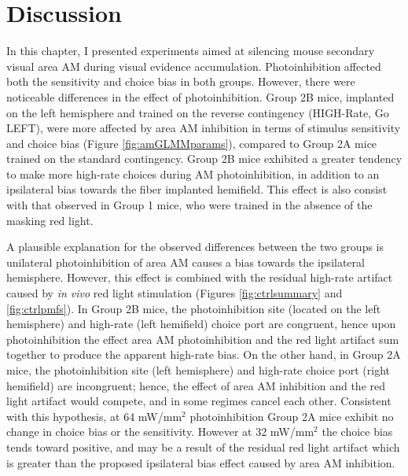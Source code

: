 \section{Discussion}
In this chapter, I presented experiments aimed at silencing mouse secondary visual area AM during visual evidence accumulation. Photoinhibition affected both the sensitivity and choice bias in both groups. However, there were noticeable differences in the effect of photoinhibition. Group 2B mice, implanted on the left hemisphere and trained on the reverse contingency (HIGH-Rate, Go LEFT), were more affected by area AM inhibition in terms of stimulus sensitivity and choice bias (Figure \ref{fig:amGLMMparams}), compared to Group 2A mice trained on the standard contingency. Group 2B mice exhibited a greater tendency to make more high-rate choices during AM photoinhibition, in addition to an ipsilateral bias towards the fiber implanted hemifield. This effect is also consist with that observed in Group 1 mice, who were trained in the absence of the masking red light. \par 

A plausible explanation for the observed differences between the two groups is unilateral photoinhibition of area AM causes a bias towards the ipsilateral hemisphere. However, this effect is combined with the residual high-rate artifact caused by \emph{in vivo} red light stimulation (Figures \ref{fig:ctrlsummary} and \ref{fig:ctrlpmfs}). In Group 2B mice, the photoinhibition site (located on the left hemisphere) and high-rate (left hemifield) choice port are congruent, hence upon photoinhibition the effect area AM photoinhibition and the red light artifact sum together to produce the apparent high-rate bias. On the other hand, in Group 2A mice, the photoinhibition site (left hemisphere) and high-rate choice port (right hemifield) are incongruent; hence, the effect of area AM inhibition and the red light artifact would compete, and in some regimes cancel each other. Consistent with this hypothesis, at 64 mW/mm$^{2}$ photoinhibition Group 2A mice exhibit no change in choice bias or the sensitivity. However at 32 mW/mm$^{2}$ the choice bias tends toward positive, and may be a result of the residual red light artifact which is greater than the proposed ipsilateral bias effect caused by area AM inhibition. \par

